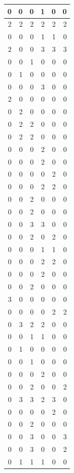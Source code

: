 \documentclass[
  12pt,
]{krantz}
\begin{document}
\begin{tabular}{r|r|r|r|r|r}
\hline
0 & 0 & 0 & 1 & 0 & 0\\
\hline
2 & 2 & 2 & 2 & 2 & 2\\
\hline
0 & 0 & 0 & 1 & 1 & 0\\
\hline
2 & 0 & 0 & 3 & 3 & 3\\
\hline
0 & 0 & 1 & 0 & 0 & 0\\
\hline
0 & 1 & 0 & 0 & 0 & 0\\
\hline
0 & 0 & 0 & 3 & 0 & 0\\
\hline
2 & 0 & 0 & 0 & 0 & 0\\
\hline
0 & 2 & 0 & 0 & 0 & 0\\
\hline
0 & 2 & 2 & 0 & 0 & 0\\
\hline
0 & 2 & 2 & 0 & 0 & 0\\
\hline
0 & 0 & 0 & 2 & 0 & 0\\
\hline
0 & 0 & 0 & 2 & 0 & 0\\
\hline
0 & 0 & 0 & 0 & 2 & 0\\
\hline
0 & 0 & 0 & 2 & 2 & 0\\
\hline
0 & 0 & 2 & 0 & 0 & 0\\
\hline
0 & 0 & 2 & 0 & 0 & 0\\
\hline
0 & 0 & 3 & 3 & 0 & 0\\
\hline
0 & 0 & 2 & 0 & 2 & 0\\
\hline
0 & 0 & 0 & 1 & 1 & 0\\
\hline
0 & 0 & 0 & 2 & 2 & 0\\
\hline
0 & 0 & 0 & 2 & 0 & 0\\
\hline
0 & 0 & 2 & 0 & 0 & 0\\
\hline
3 & 0 & 0 & 0 & 0 & 0\\
\hline
0 & 0 & 0 & 0 & 2 & 2\\
\hline
0 & 3 & 2 & 2 & 0 & 0\\
\hline
0 & 0 & 1 & 1 & 0 & 0\\
\hline
0 & 1 & 0 & 0 & 0 & 0\\
\hline
0 & 0 & 1 & 0 & 0 & 0\\
\hline
0 & 0 & 0 & 2 & 0 & 0\\
\hline
0 & 0 & 2 & 0 & 0 & 2\\
\hline
0 & 3 & 3 & 2 & 3 & 0\\
\hline
0 & 0 & 0 & 0 & 2 & 0\\
\hline
0 & 0 & 2 & 0 & 0 & 0\\
\hline
0 & 0 & 3 & 0 & 0 & 3\\
\hline
0 & 0 & 3 & 0 & 0 & 2\\
\hline
0 & 1 & 1 & 1 & 0 & 0\\

\end{tabular}
\end{document}
